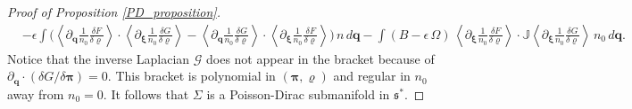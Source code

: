 \documentclass[%
 aip,
 amsmath,amssymb,
reprint, onecolumn %
]{revtex4-1}
\begin{document}
\begin{proof}[Proof of Proposition \ref{PD_proposition}]
\begin{align}
&-\epsilon\int \bigg(\left\langle\partial_{\bm{q}}\frac{1}{n_0}\frac{\delta F}{\delta\varrho}\right\rangle\cdot\left\langle\partial_{\bm{\xi}}\frac{1}{n_0}\frac{\delta G}{\delta\varrho}\right\rangle-\left\langle\partial_{\bm{q}}\frac{1}{n_0}\frac{\delta G}{\delta\varrho}\right\rangle\cdot\left\langle\partial_{\bm{\xi}}\frac{1}{n_0}\frac{\delta F}{\delta\varrho}\right\rangle\bigg)\,n\,d\bm{q}-\int (B-\epsilon\,\Omega)\, \left\langle\partial_{\bm{\xi}}\frac{1}{n_0}\frac{\delta F}{\delta\varrho}\right\rangle\cdot \mathbb{J} \left\langle\partial_{\bm{\xi}}\frac{1}{n_0}\frac{\delta G}{\delta\varrho}\right\rangle\,n_0\,d\bm{q}.\label{QNVP_cbracket}
\end{align}
Notice that the inverse Laplacian $\mathcal{G}$ does not appear in the bracket because of $\partial_{\bm{q}}\cdot (\delta G/\delta\bm{\pi}) = 0$. This bracket is polynomial in $(\bm{\pi},\varrho)$ and regular in $n_0$ away from $n_0 = 0$. It follows that $\Sigma$ is a Poisson-Dirac submanifold in $\mathfrak{s}^*$. 

\end{proof}
\end{document}
